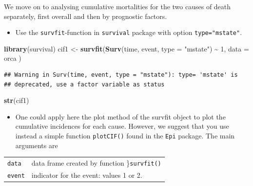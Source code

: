 \documentclass[
]{book}
\newenvironment{Shaded}{\begin{snugshade}}{\end{snugshade}}
\newcommand{\AttributeTok}[1]{\textcolor[rgb]{0.13,0.29,0.53}{#1}}
\newcommand{\DecValTok}[1]{\textcolor[rgb]{0.00,0.00,0.81}{#1}}
\newcommand{\FunctionTok}[1]{\textcolor[rgb]{0.13,0.29,0.53}{\textbf{#1}}}
\newcommand{\NormalTok}[1]{#1}
\newcommand{\OtherTok}[1]{\textcolor[rgb]{0.56,0.35,0.01}{#1}}
\newcommand{\SpecialCharTok}[1]{\textcolor[rgb]{0.81,0.36,0.00}{\textbf{#1}}}
\newcommand{\StringTok}[1]{\textcolor[rgb]{0.31,0.60,0.02}{#1}}
\newcounter{none} %
\providecommand{\tightlist}{%
  \setlength{\itemsep}{0pt}\setlength{\parskip}{0pt}}
\begin{document}
We move on to analysing cumulative mortalities for the two causes of
death separately, first overall and then by prognostic factors.

\begin{itemize}
\tightlist
\item
  Use the \texttt{survfit}-function in \texttt{survival} package with option
  \texttt{type="mstate"}.
\end{itemize}

\begin{Shaded}
\begin{Highlighting}[]
\FunctionTok{library}\NormalTok{(survival)}
\NormalTok{cif1 }\OtherTok{\textless{}{-}} \FunctionTok{survfit}\NormalTok{(}\FunctionTok{Surv}\NormalTok{(time, event, }\AttributeTok{type =} \StringTok{"mstate"}\NormalTok{) }\SpecialCharTok{\textasciitilde{}} \DecValTok{1}\NormalTok{,}
  \AttributeTok{data =}\NormalTok{ orca}
\NormalTok{)}
\end{Highlighting}
\end{Shaded}

\begin{verbatim}
## Warning in Surv(time, event, type = "mstate"): type= 'mstate' is
## deprecated, use a factor variable as status
\end{verbatim}

\begin{Shaded}
\begin{Highlighting}[]
\FunctionTok{str}\NormalTok{(cif1)}
\end{Highlighting}
\end{Shaded}

\begin{itemize}
\tightlist
\item
  One could apply here the plot method of the survfit object to plot the
  cumulative incidences for each cause. However, we suggest that you use
  instead a simple function \texttt{plotCIF()} found in the \texttt{Epi} package. The
  main arguments are
\end{itemize}

{\def\LTcaptype{none} %
\begin{longtable}[]{@{}ll@{}}
\toprule\noalign{}
\endhead
\bottomrule\noalign{}
\endlastfoot
\texttt{data} & data frame created by function \}\texttt{survfit()} \\
\texttt{event} & indicator for the event: values 1 or 2. \\
\end{longtable}
}
\end{document}
